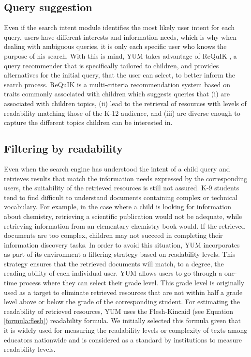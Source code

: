 \documentclass{sig-alternate-05-2015}
\begin{document}
\subsection{Query suggestion}
Even if the search intent module identifies the most likely user intent for each query, users have different interests and information needs, which is why when dealing with ambiguous queries, it is only each specific user who knows the purpose of his search. With this is mind,  YUM takes advantage of ReQuIK \cite{Requik}, a query recommender that is specifically tailored to children, and provides alternatives for the initial query, that the user can select, to better inform the search process. ReQuIK is a multi-criteria recommendation system based on traits commonly associated with children which suggests queries that (i) are associated with children topics, (ii) lead to the retrieval of resources with levels of readability matching those of the K-12 audience, and (iii) are diverse enough to capture the different topics children can be interested in.


\subsection{Filtering by readability}
Even when the search engine has understood the intent of a child query and retrieves results that match the information needs expressed by the corresponding users, the suitability of the retrieved resources is still not assured.  K-9 students tend to find difficult to understand documents containing complex or technical vocabulary. For example, in the case where a child is looking for information about chemistry, retrieving a scientific publication would not be adequate, while retrieving information from an elementary chemistry book would. If the retrieved documents are too complex, children may not succeed in completing their information discovery tasks. In order to avoid this situation, YUM incorporates as part of its environment a filtering strategy based on readability levels. This strategy   ensures that the retrieved documents will match, to a degree, the reading ability of each individual user. YUM allows users to go through a one-time process where they can select their grade level. This grade level is originally used as a target to eliminate retrieved resources that are not within half a grade level above or below the grade of the corresponding student. For estimating the readability of retrieved resources, YUM uses the Flesh-Kincaid \cite{Fle48} (see Equation \ref{formula:flesh}) readability formula. We initially selected this formula given that it is widely used for measuring the readability levels or complexity of texts among educators nationwide and is considered as a standard by institutions \cite{Ibr16} to measure readability levels.  
\end{document}
